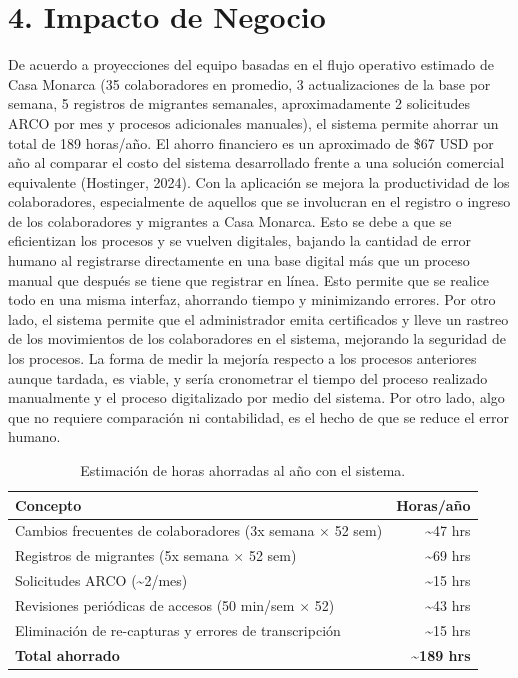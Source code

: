 \documentclass[10pt,letterpaper]{report}
\begin{document}
 
\section*{4. Impacto de Negocio}
 
De acuerdo a proyecciones del equipo basadas en el flujo operativo estimado de Casa Monarca (35 colaboradores en promedio, 3 actualizaciones de la base por semana, 5 registros de migrantes semanales, aproximadamente 2 solicitudes ARCO por mes y procesos adicionales manuales), el sistema permite ahorrar un total de 189 horas/año. El ahorro financiero es un aproximado de \$67 USD por año al comparar el costo del sistema desarrollado frente a una solución comercial equivalente (Hostinger, 2024). Con la aplicación se mejora la productividad de los colaboradores, especialmente de aquellos que se involucran en el registro o ingreso de los colaboradores y migrantes  a Casa Monarca. Esto se debe a que se eficientizan los procesos y se vuelven digitales, bajando la cantidad de error humano al registrarse directamente en una base digital más que un proceso manual que después se tiene que registrar en línea. Esto permite que se realice todo en una misma interfaz, ahorrando tiempo y minimizando errores. Por otro lado, el sistema permite que el administrador emita certificados y lleve un rastreo de los movimientos de los colaboradores en el sistema, mejorando la seguridad de los procesos. La forma de medir la mejoría respecto a los procesos anteriores aunque tardada, es viable, y sería cronometrar el tiempo del proceso realizado manualmente y el proceso digitalizado por medio del sistema. Por otro lado, algo que no requiere comparación ni contabilidad, es el hecho de que se reduce el error humano.

\begin{table}[H]
\centering
\small
\begin{tabularx}{\textwidth}{Xr}
\toprule
\textbf{Concepto} & \textbf{Horas/año} \\
\midrule
Cambios frecuentes de colaboradores (3x semana $\times$ 52 sem) & \textasciitilde47 hrs \\
Registros de migrantes (5x semana $\times$ 52 sem)              & \textasciitilde69 hrs \\
Solicitudes ARCO (\textasciitilde2/mes)                          & \textasciitilde15 hrs \\
Revisiones periódicas de accesos (50 min/sem $\times$ 52)       & \textasciitilde43 hrs \\
Eliminación de re-capturas y errores de transcripción           & \textasciitilde15 hrs \\
\textbf{Total ahorrado}                                          & \textbf{\textasciitilde189 hrs} \\
\bottomrule
\end{tabularx}
\caption{Estimación de horas ahorradas al año con el sistema.}
\end{table}
 
\end{document}
